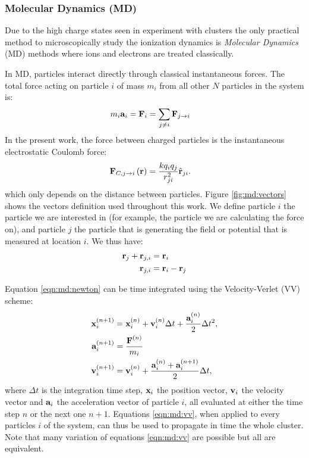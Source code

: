 

\subsubsection{Molecular Dynamics (MD)}
Due to the high charge states seen in experiment with clusters the only
practical method to microscopically study the ionization dynamics is
\textit{Molecular Dynamics} (MD) methods where ions and electrons are treated
classically.

In MD, particles interact directly through classical instantaneous forces. The
total force acting on particle $i$ of mass $m_i$ from all other $N$ particles in
the system is:
\begin{align}
m_i \textbf{a}_i & = \textbf{F}_i = \sum_{j \ne i} \textbf{F}_{j \rightarrow i}
\label{eqn:md:newton}
\end{align}
In the present work, the force between charged particles is the instantaneous
electrostatic Coulomb force:
\begin{align}
\textbf{F}_{C,j \rightarrow i}\left( \textbf{r} \right) & =\frac{k q_i q_j}{r_{ji}^2} \hat{\textbf{r}}_{ji}.
\label{eqn:md:coulomb:F}
\end{align}
which only depends on the distance between particles. Figure
\ref{fig:md:vectors} shows the vectors definition used throughout this work. We
define particle $i$ the particle we are interested in (for example, the
particle we are calculating the force on), and particle $j$ the particle that
is generating the field or potential that is measured at location $i$. We thus
have:
\begin{align}
\textbf{r}_{j} + \textbf{r}_{j,i} & = \textbf{r}_{i} \\
\textbf{r}_{j,i} & = \textbf{r}_{i} - \textbf{r}_{j}
\end{align}



Equation \eqref{eqn:md:newton} can be time integrated using the
Velocity-Verlet (VV) scheme:
\begin{subequations}
\begin{align}
\textbf{x}_{i}^{\left( n+1 \right)} & = \textbf{x}_{i}^{\left( n \right)} + \textbf{v}_{i}^{\left( n \right)} \Delta t +
\frac{\textbf{a}_{i}^{\left( n \right)}}{2} \Delta t^2, \\
\textbf{a}_{i}^{\left( n+1 \right)} & = \frac{\textbf{F}^{\left( n \right)}}{m_i} \label{eqn:md:vv:a} \\
\textbf{v}_{i}^{\left( n+1 \right)} & = \textbf{v}_{i}^{\left( n \right)} + \frac{\textbf{a}_{i}^{\left( n \right)} +
\textbf{a}_{i}^{\left( n+1 \right)}}{2} \Delta t,
\end{align}
\label{eqn:md:vv}
\end{subequations}
where $\Delta t$ is the integration time step, $\textbf{x}_{i}$ the position vector,
$\textbf{v}_{i}$ the velocity vector and $\textbf{a}_{i}$ the acceleration vector of
particle $i$, all evaluated at either the time step $n$ or the next one $n+1$.
Equations \eqref{eqn:md:vv}, when applied to every particles $i$ of the system,
can thus be used to propagate in time the whole cluster. Note that many
variation of equations \eqref{eqn:md:vv} are possible but all are equivalent.

